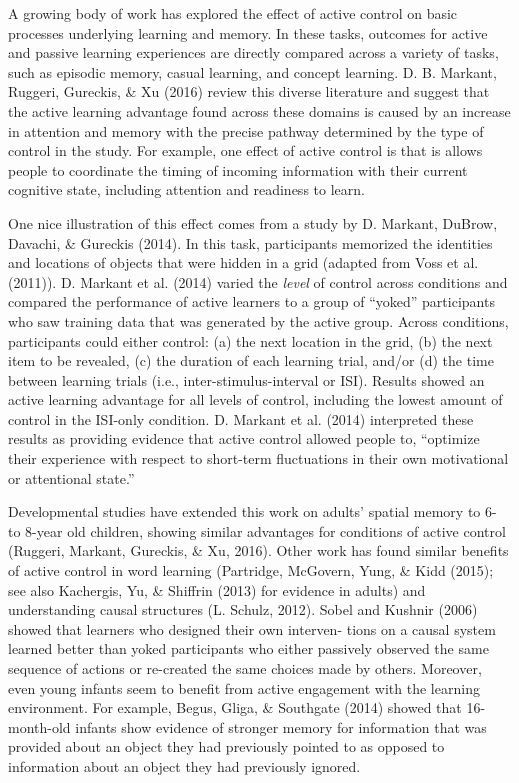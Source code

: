 \documentclass[a4paper,man,apacite,floatsintext]{apa6}
\begin{document}
A growing body of work has explored the effect of active control on
basic processes underlying learning and memory. In these tasks, outcomes
for active and passive learning experiences are directly compared across
a variety of tasks, such as episodic memory, casual learning, and
concept learning. D. B. Markant, Ruggeri, Gureckis, \& Xu (2016) review
this diverse literature and suggest that the active learning advantage
found across these domains is caused by an increase in attention and
memory with the precise pathway determined by the type of control in the
study. For example, one effect of active control is that is allows
people to coordinate the timing of incoming information with their
current cognitive state, including attention and readiness to learn.

One nice illustration of this effect comes from a study by D. Markant,
DuBrow, Davachi, \& Gureckis (2014). In this task, participants
memorized the identities and locations of objects that were hidden in a
grid (adapted from Voss et al. (2011)). D. Markant et al. (2014) varied
the \emph{level} of control across conditions and compared the
performance of active learners to a group of ``yoked'' participants who
saw training data that was generated by the active group. Across
conditions, participants could either control: (a) the next location in
the grid, (b) the next item to be revealed, (c) the duration of each
learning trial, and/or (d) the time between learning trials (i.e.,
inter-stimulus-interval or ISI). Results showed an active learning
advantage for all levels of control, including the lowest amount of
control in the ISI-only condition. D. Markant et al. (2014) interpreted
these results as providing evidence that active control allowed people
to, ``optimize their experience with respect to short-term fluctuations
in their own motivational or attentional state.''

Developmental studies have extended this work on adults' spatial memory
to 6- to 8-year old children, showing similar advantages for conditions
of active control (Ruggeri, Markant, Gureckis, \& Xu, 2016). Other work
has found similar benefits of active control in word learning
(Partridge, McGovern, Yung, \& Kidd (2015); see also Kachergis, Yu, \&
Shiffrin (2013) for evidence in adults) and understanding causal
structures (L. Schulz, 2012). Sobel and Kushnir (2006) showed that
learners who designed their own interven- tions on a causal system
learned better than yoked participants who either passively observed the
same sequence of actions or re-created the same choices made by others.
Moreover, even young infants seem to benefit from active engagement with
the learning environment. For example, Begus, Gliga, \& Southgate (2014)
showed that 16-month-old infants show evidence of stronger memory for
information that was provided about an object they had previously
pointed to as opposed to information about an object they had previously
ignored.
\end{document}
